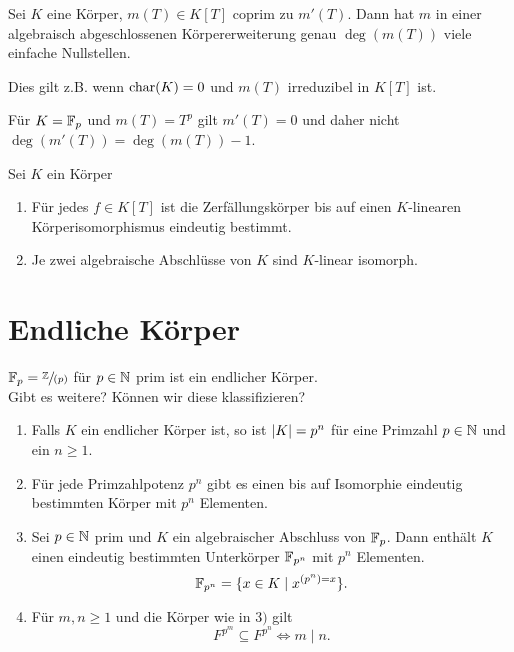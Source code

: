 \begin{lemma}
	Sei $K$ eine Körper, $m(T) \in K[T]$ coprim zu $m'(T)$. Dann hat $m$ in einer algebraisch abgeschlossenen Körpererweiterung
	genau $\deg(m(T))$ viele einfache Nullstellen.

	Dies gilt z.B. wenn $\operatorname{char}(K) = 0$ und $m(T)$ irreduzibel in $K[T]$ ist.
\end{lemma}


\begin{remark}
	 Für $K = \mathbb{F}_{p}$ und $m(T) = T^{p}$ gilt $m'(T) = 0$ und daher nicht $\deg(m'(T)) = \deg(m(T)) -1$.
\end{remark}




\begin{corollary}
	Sei $K$ ein Körper
	\begin{enumerate}[1)]
		\item Für jedes $f \in K[T]$ ist die Zerfällungskörper bis auf einen $K$-linearen Körperisomorphismus eindeutig bestimmt.
		\item Je zwei algebraische Abschlüsse von $K$ sind $K$-linear isomorph.
	\end{enumerate}
\end{corollary}


\section{Endliche Körper}
$\mathbb{F}_{p} = \sfrac{\mathbb{Z}}{(p)}$ für $p \in \mathbb{N}$ prim ist ein endlicher Körper.\\
Gibt es weitere? Können wir diese klassifizieren?

\begin{theorem}
	\begin{enumerate}
		\item Falls $K$ ein endlicher Körper ist, so ist $\abs{K} = p^{n}$ für eine Primzahl $p \in \mathbb{N}$ und ein $n \geq 1$.
		\item Für jede Primzahlpotenz $p^{n}$ gibt es einen bis auf Isomorphie eindeutig bestimmten Körper mit $p^{n}$ Elementen.
		\item Sei $p \in \mathbb{N}$ prim und $K$ ein algebraischer Abschluss von $\mathbb{F}_{p}$. Dann enthält $K$ einen eindeutig bestimmten
			Unterkörper $\mathbb{F}_{p^{n}}$ mit $p^{n}$ Elementen.
			\[
				\mathbb{F}_{p^{n}} = \{x \in K \mid x^{\left( p^{n} \right) = x}\} 
			.\] 
		\item Für $m,n \geq 1$ und die Körper wie in $3)$ gilt
			\[
			F^{p^{m}} \subseteq F^{p^{n}} \Leftrightarrow m \mid n
			.\] 
	\end{enumerate}
\end{theorem}


